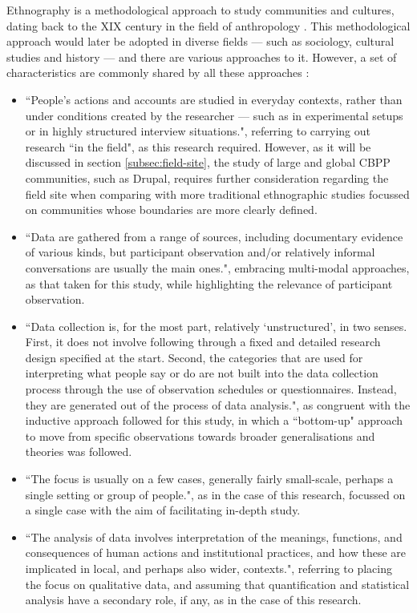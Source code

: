 Ethnography is a methodological approach to study communities and cultures, dating back to the XIX century in the field of anthropology \parencite{hammersley2007ethnography}. This methodological approach would later be adopted in diverse fields --- such as sociology, cultural studies and history --- and there are various approaches to it. However, a set of characteristics are commonly shared by all these approaches \parencite[3]{hammersley2007ethnography}:

\begin{itemize}
	\item ``People's actions and accounts are studied in everyday contexts, rather than under conditions created by the researcher --- such as in experimental setups or in highly structured interview situations.", referring to carrying out research ``in the field", as this research required. However, as it will be discussed in section \ref{subsec:field-site}, the study of large and global CBPP communities, such as Drupal, requires further consideration regarding the field site when comparing with more traditional ethnographic studies focussed on communities whose boundaries are more clearly defined.
	\item ``Data are gathered from a range of sources, including documentary evidence of various kinds, but participant observation and\slash or relatively informal conversations are usually the main ones.", embracing multi-modal approaches, as that taken for this study, while highlighting the relevance of participant observation.
	\item ``Data collection is, for the most part, relatively `unstructured', in two senses. First, it does not involve following through a fixed and detailed research design specified at the start. Second, the categories that are used for interpreting what people say or do are not built into the data collection process through the use of observation schedules or questionnaires. Instead, they are generated out of the process of data analysis.", as congruent with the inductive approach followed for this study, in which a ``bottom-up" approach to move from specific observations towards broader generalisations and theories was followed.
	\item ``The focus is usually on a few cases, generally fairly small-scale, perhaps a single
setting or group of people.", as in the case of this research, focussed on a single case with the aim of facilitating in-depth study.
	\item ``The analysis of data involves interpretation of the meanings, functions, and consequences of human actions and institutional practices, and how these are implicated in local, and perhaps also wider, contexts.", referring to placing the focus on qualitative data, and assuming that quantification and statistical analysis have a secondary role, if any, as in the case of this research.
\end{itemize}

